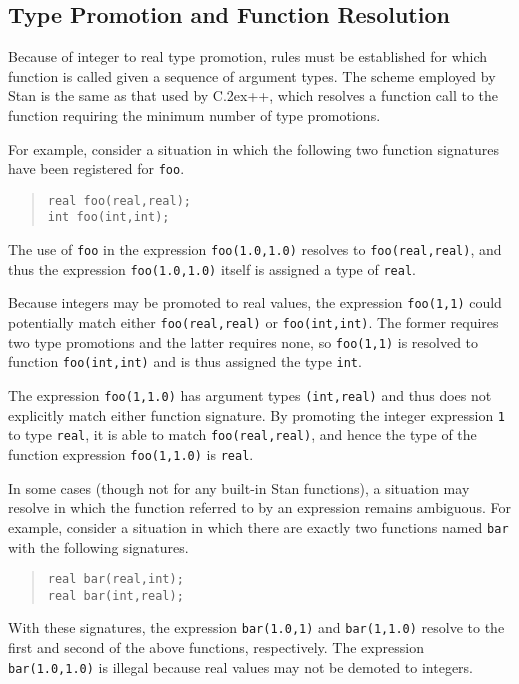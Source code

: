 \documentclass[10pt]{report}
\newcommand{\Stan}{Stan\xspace}
\newcommand*{\Cpp}{C\raise.2ex\hbox{\footnotesize ++}\xspace} %
\newcommand{\code}[1]{{\tt #1}}
\begin{document}
\subsection{Type Promotion and Function Resolution}

Because of integer to real type promotion, rules must be established
for which function is called given a sequence of argument types.  The
scheme employed by \Stan is the same as that used by \Cpp, which
resolves a function call to the function requiring the minimum number
of type promotions.  

For example, consider a situation in which the following two function
signatures have been registered for \code{foo}.
%
\begin{quote}
\code{real foo(real,real);}
\\
\code{int foo(int,int);}
\end{quote}
%
The use of \code{foo} in the expression \code{foo(1.0,1.0)} resolves
to \code{foo(real,real)}, and thus the expression \code{foo(1.0,1.0)}
itself is assigned a type of \code{real}.  

Because integers may be promoted to real values, the expression
\code{foo(1,1)} could potentially match either \code{foo(real,real)}
or \code{foo(int,int)}.  The former requires two type promotions and
the latter requires none, so \code{foo(1,1)} is resolved to function
\code{foo(int,int)} and is thus assigned the type \code{int}.

The expression \code{foo(1,1.0)} has argument types \code{(int,real)}
and thus does not explicitly match either function signature.  By
promoting the integer expression \code{1} to type \code{real}, it is
able to match \code{foo(real,real)}, and hence the type of the
function expression \code{foo(1,1.0)} is \code{real}.

In some cases (though not for any built-in \Stan functions), a
situation may resolve in which the function referred to by an
expression remains ambiguous.  For example, consider a situation in
which there are exactly two functions named \code{bar} with the
following signatures.
%
\begin{quote}
\code{real bar(real,int);}
\\
\code{real bar(int,real);}
\end{quote}
%
With these signatures, the expression \code{bar(1.0,1)} and
\code{bar(1,1.0)} resolve to the first and second of the above
functions, respectively.  The expression \code{bar(1.0,1.0)} is
illegal because real values may not be demoted to integers.  
\end{document}
